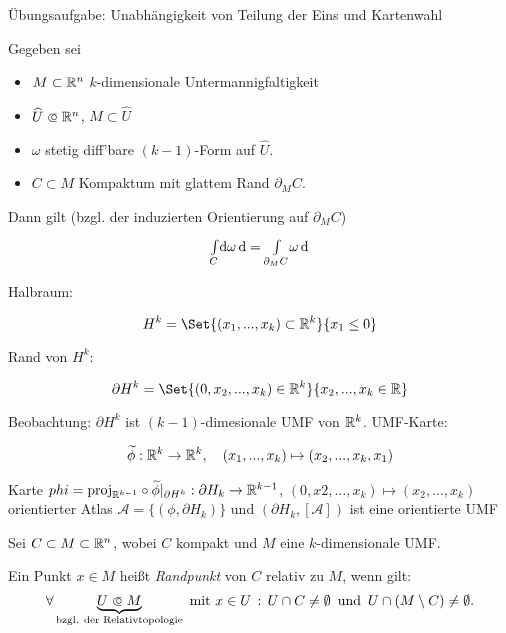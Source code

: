 \documentclass{cheat-sheet}
\newcommand{\Atlas}{\mathcal{A}} %
\begin{document}
Übungsaufgabe: Unabhängigkeit von Teilung der Eins und Kartenwahl


\begin{satz}[Stokes]
  Gegeben sei
  \begin{itemize}
    \item $M \subset \mathbb{R}^n$ $k$-dimensionale Untermannigfaltigkeit
    \item $\widehat{U} \opn \R^n$, $M \subset \widehat{U}$
    \item $\omega$ stetig diff'bare $(k{-}1)$-Form auf $\widehat{U}$.
    \item $C \subset M$ Kompaktum mit glattem Rand $\partial_M C$.
  \end{itemize}
  Dann gilt (bzgl. der induzierten Orientierung auf $\partial_M C$)
  \[ {\textstyle \int\limits_{C}^{}} \mathrm{d} \omega \,\mathrm{d} = {\textstyle \int\limits_{\partial_M C}^{}} \omega \,\mathrm{d} \]
\end{satz}


Halbraum:

\[ H^k = \Set{ (x_1, ..., x_k) \subset \R^k }{ x_1 \leq 0 } \]

Rand von $H^k$:

\[ \partial H^k = \Set{ (0, x_2, ..., x_k) \in \R^k }{ x_2, ..., x_k \in \R } \]

Beobachtung: $\partial H^k$ ist $(k{-}1)$-dimesionale UMF von $\mathbb{R}^k$.
UMF-Karte:

\begin{align*}
  \widetilde{\phi} : \mathbb{R}^k \to \mathbb{R}^k, \quad (x_1, ..., x_k) \mapsto (x_2, ..., x_k, x_1)
\end{align*}

Karte $phi = \mathrm{proj}_{\mathbb{R}^{k{-}1}} \circ \widetilde{\phi}|_{\partial H^k} : \partial H_k \to \mathbb{R}^{k{-}1}$, $(0, x2, ..., x_k) \mapsto (x_2, ..., x_k)$
orientierter Atlas $\Atlas = \{ (\phi, \partial H_k) \}$ und $(\partial H_k, [\Atlas])$ ist eine orientierte UMF


\begin{defn}
  Sei $C \subset M \subset \mathbb{R}^n$, wobei $C$ kompakt und $M$ eine $k$-dimensionale UMF.

  Ein Punkt $x \in M$ heißt \emph{Randpunkt} von $C$ relativ zu $M$, wenn gilt:
  \[ \fa{\underbrace{U \opn M}_{\text{bzgl. der Relativtopologie}} \text{ mit } x \in U} U \cap C \not= \emptyset \enspace \text{und} \enspace U \cap (M \setminus C) \not= \emptyset. \]
\end{defn}
\end{document}
